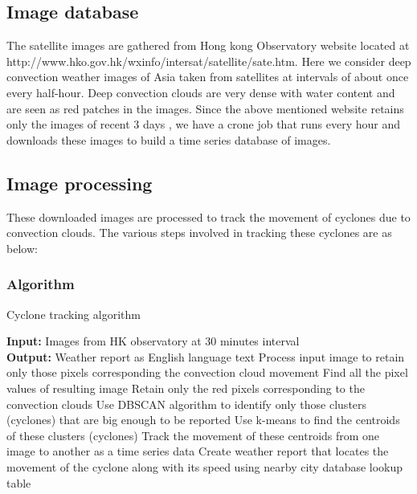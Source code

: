 \documentclass{article}
\begin{document}
\subsection{Image database}
\label{sec:db}
The satellite images are gathered from Hong kong Observatory website located at http://www.hko.gov.hk/wxinfo/intersat/satellite/sate.htm. Here we consider deep convection weather images of Asia taken from satellites at intervals of about once every half-hour. Deep convection clouds are very dense with water content and  are seen as red patches in the images. Since the above mentioned website retains only the images of recent 3 days , we have a crone job that runs every hour and downloads these images to build a time series database of images. 

\subsection{Image processing}
\label{sec:imgProcessing}
These downloaded images are processed to track the movement of cyclones due to convection clouds. The various steps involved in tracking these cyclones are as below:

\subsubsection{Algorithm}
\label{ssec:algo_image}

\begin{algorithm}[!th]
\caption{Cyclone tracking algorithm}
\label{algo:img}
\begin{algorithmic}[1]

\STATE  \textbf{Input:} Images from HK observatory at 30 minutes interval\\
\textbf{Output:} Weather report as English language text 
\STATE Process input image to retain only those pixels corresponding the convection cloud movement
\STATE Find all the pixel values of resulting image
\STATE Retain only the red pixels corresponding to the convection clouds
\STATE Use DBSCAN algorithm to identify only those clusters (cyclones) that are big enough to be reported
\STATE Use k-means to find the centroids of these clusters (cyclones)
\STATE Track the movement of these centroids from one image to another as a time series data
\STATE Create weather report that locates the movement of the cyclone along with its speed using nearby city database lookup table
\end{algorithmic}
\end{algorithm}
\end{document}
